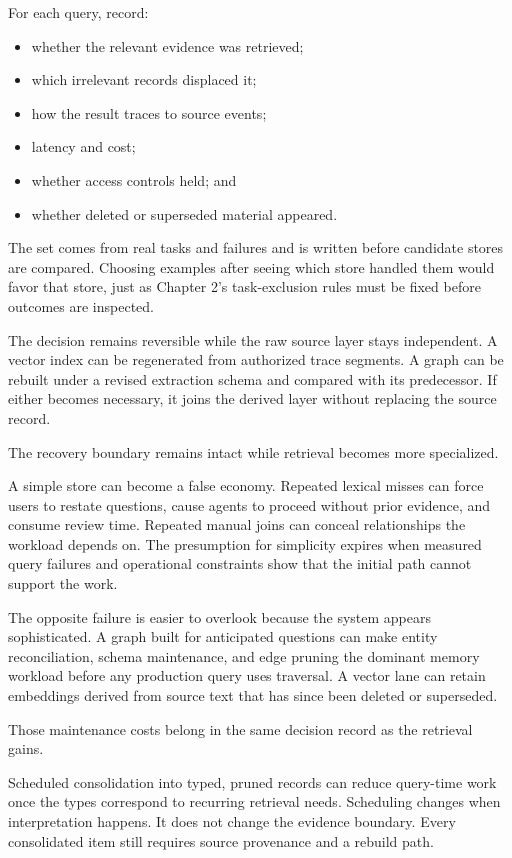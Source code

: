 
For each query, record:

\begin{itemize}
\tightlist
\item
  whether the relevant evidence was retrieved;
\item
  which irrelevant records displaced it;
\item
  how the result traces to source events;
\item
  latency and cost;
\item
  whether access controls held; and
\item
  whether deleted or superseded material appeared.
\end{itemize}

The set comes from real tasks and failures and is written before candidate stores are compared. Choosing examples after seeing which store handled them would favor that store, just as Chapter 2's task-exclusion rules must be fixed before outcomes are inspected.

The decision remains reversible while the raw source layer stays independent. A vector index can be regenerated from authorized trace segments. A graph can be rebuilt under a revised extraction schema and compared with its predecessor. If either becomes necessary, it joins the derived layer without replacing the source record.

The recovery boundary remains intact while retrieval becomes more specialized.

A simple store can become a false economy. Repeated lexical misses can force users to restate questions, cause agents to proceed without prior evidence, and consume review time. Repeated manual joins can conceal relationships the workload depends on. The presumption for simplicity expires when measured query failures and operational constraints show that the initial path cannot support the work.

The opposite failure is easier to overlook because the system appears sophisticated. A graph built for anticipated questions can make entity reconciliation, schema maintenance, and edge pruning the dominant memory workload before any production query uses traversal. A vector lane can retain embeddings derived from source text that has since been deleted or superseded.

Those maintenance costs belong in the same decision record as the retrieval gains.

Scheduled consolidation into typed, pruned records can reduce query-time work once the types correspond to recurring retrieval needs. Scheduling changes when interpretation happens. It does not change the evidence boundary. Every consolidated item still requires source provenance and a rebuild path.

